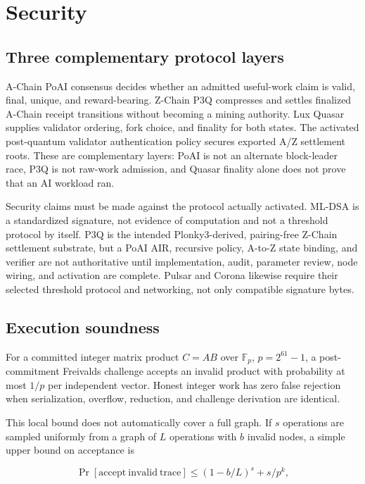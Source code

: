 \section{Security}
\label{sec:security}

\subsection{Three complementary protocol layers}

A-Chain PoAI consensus decides whether an admitted useful-work claim is valid,
final, unique, and reward-bearing. Z-Chain P3Q compresses and settles finalized
A-Chain receipt transitions without becoming a mining authority. Lux Quasar
supplies validator ordering, fork choice, and finality for both states. The
activated post-quantum validator authentication policy secures exported A/Z
settlement roots. These are complementary layers: PoAI is not an alternate
block-leader race, P3Q is not raw-work admission, and Quasar finality alone does
not prove that an AI workload ran.

Security claims must be made against the protocol actually activated. ML-DSA is
a standardized signature, not evidence of computation and not a threshold
protocol by itself. P3Q is the intended Plonky3-derived, pairing-free Z-Chain
settlement substrate, but a PoAI AIR, recursive policy, A-to-Z state binding,
and verifier are not authoritative until implementation, audit, parameter
review, node wiring, and activation are complete. Pulsar and
Corona likewise require their selected threshold protocol and networking, not
only compatible signature bytes.

\subsection{Execution soundness}

For a committed integer matrix product $C=AB$ over
$\mathbb{F}_{p}$, $p=2^{61}-1$, a post-commitment Freivalds challenge accepts an
invalid product with probability at most $1/p$ per independent vector. Honest
integer work has zero false rejection when serialization, overflow, reduction,
and challenge derivation are identical.

This local bound does not automatically cover a full graph. If $s$ operations
are sampled uniformly from a graph of $L$ operations with $b$ invalid nodes, a
simple upper bound on acceptance is

\begin{equation}
  \Pr[\mathrm{accept\ invalid\ trace}] \leq (1-b/L)^s+s/p^k,
\end{equation}

